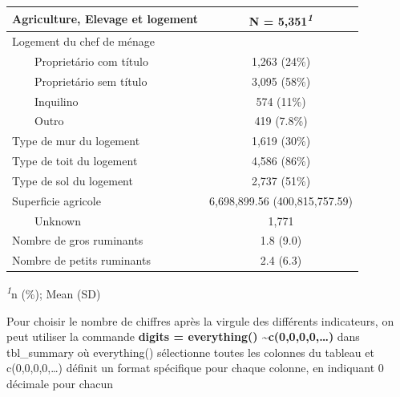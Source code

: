 \documentclass[
]{article}
\begin{document}
\begin{table}[!t]
\fontsize{12.0pt}{14.4pt}\selectfont
\begin{tabular*}{\linewidth}{@{\extracolsep{\fill}}lc}
\toprule
Agriculture, Elevage et logement & \textbf{N = 5,351}\textsuperscript{\textit{1}} \\ 
\midrule\addlinespace[2.5pt]
Logement du chef de ménage &  \\ 
    Proprietário com título & 1,263 (24\%) \\ 
    Proprietário sem título & 3,095 (58\%) \\ 
    Inquilino & 574 (11\%) \\ 
    Outro & 419 (7.8\%) \\ 
Type de mur du logement & 1,619 (30\%) \\ 
Type de toit du logement & 4,586 (86\%) \\ 
Type de sol du logement & 2,737 (51\%) \\ 
Superficie agricole & 6,698,899.56 (400,815,757.59) \\ 
    Unknown & 1,771 \\ 
Nombre de gros ruminants & 1.8 (9.0) \\ 
Nombre de petits ruminants & 2.4 (6.3) \\ 
\bottomrule
\end{tabular*}
\begin{minipage}{\linewidth}
\textsuperscript{\textit{1}}n (\%); Mean (SD)\\
\end{minipage}
\end{table}

Pour choisir le nombre de chiffres après la virgule des différents
indicateurs, on peut utiliser la commande \textbf{digits = everything()
\textasciitilde c(0,0,0,0,\ldots)} dans tbl\_summary où everything()
sélectionne toutes les colonnes du tableau et c(0,0,0,0,\ldots) définit
un format spécifique pour chaque colonne, en indiquant 0 décimale pour
chacun
\end{document}
